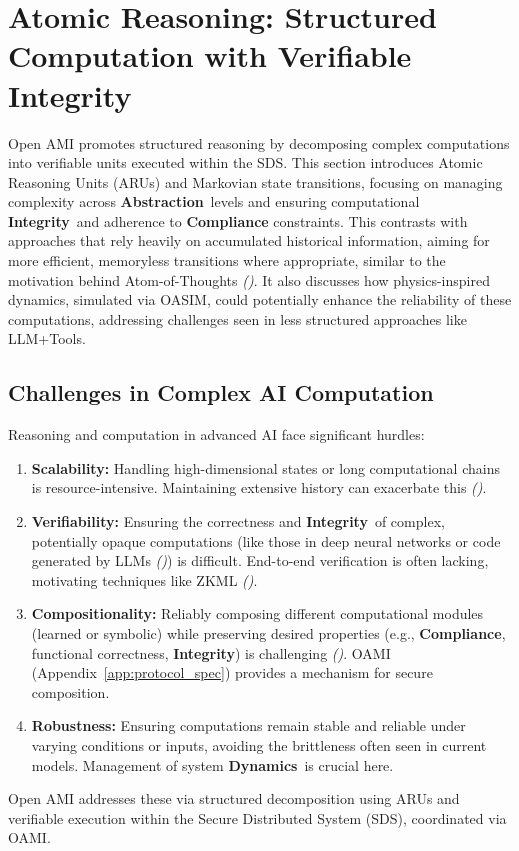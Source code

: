 \documentclass[12pt,a4paper]{report}
\renewcommand{\citep}[1]{\textit{\scriptsize{(\cite{#1})}}}
\newcommand{\Integrity}{\textbf{Integrity}}
\newcommand{\Abstraction}{\textbf{Abstraction}}
\newcommand{\Dynamics}{\textbf{Dynamics}}
\begin{document}
	\section{Atomic Reasoning: Structured Computation with Verifiable Integrity}
	\label{sec:2-4}
	
	Open AMI promotes structured reasoning by decomposing complex computations into verifiable units executed within the SDS. This section introduces Atomic Reasoning Units (ARUs) and Markovian state transitions, focusing on managing complexity across \Abstraction\ levels and ensuring computational \Integrity\ and adherence to \textbf{Compliance} constraints. This contrasts with approaches that rely heavily on accumulated historical information, aiming for more efficient, memoryless transitions where appropriate, similar to the motivation behind Atom-of-Thoughts \citep{Teng2025AtomOfThoughtsRef}. It also discusses how physics-inspired dynamics, simulated via OASIM, could potentially enhance the reliability of these computations, addressing challenges seen in less structured approaches like LLM+Tools.
	
	\subsection{Challenges in Complex AI Computation}
	\label{sec:2-4-1}
	
	Reasoning and computation in advanced AI face significant hurdles:
	\begin{enumerate}
		\item \textbf{Scalability:} Handling high-dimensional states or long computational chains is resource-intensive. Maintaining extensive history can exacerbate this \citep{Teng2025AtomOfThoughtsRef}.
		\item \textbf{Verifiability:} Ensuring the correctness and \Integrity\ of complex, potentially opaque computations (like those in deep neural networks or code generated by LLMs \citep{Physics-InspiredReasoning_Ref10}) is difficult. End-to-end verification is often lacking, motivating techniques like ZKML \citep{Peng2025ZKMLSurvey}.
		\item \textbf{Compositionality:} Reliably composing different computational modules (learned or symbolic) while preserving desired properties (e.g., \textbf{Compliance}, functional correctness, \Integrity) is challenging \citep{Buehler2025AgenticGraphRef}. OAMI (Appendix~\ref{app:protocol_spec}) provides a mechanism for secure composition.
		\item \textbf{Robustness:} Ensuring computations remain stable and reliable under varying conditions or inputs, avoiding the brittleness often seen in current models. Management of system \Dynamics\ is crucial here.
	\end{enumerate}
	Open AMI addresses these via structured decomposition using ARUs and verifiable execution within the Secure Distributed System (SDS), coordinated via OAMI.
	
\end{document}
